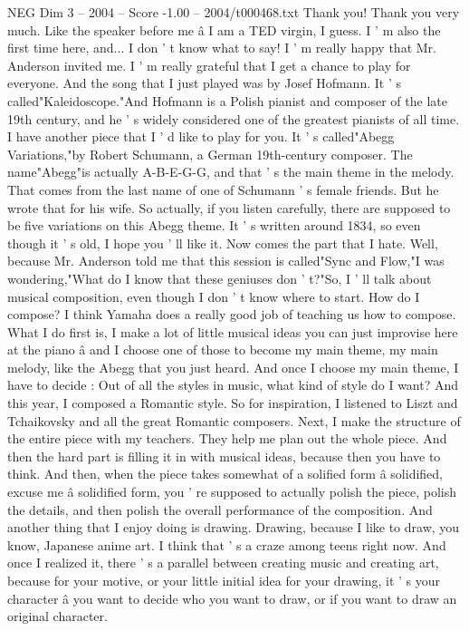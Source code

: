 \begin{textsample}{NEG Dim 3 – 2004 – Score -1.00 – 2004/t000468.txt}  \label{ex:f3_neg_014}
Thank you!
Thank you very much.
Like the speaker before me â I am a TED virgin, I guess.
I ' m also the first time here, and...
I don ' t know what to say!
I ' m really happy that Mr.
Anderson invited me.
I ' m really grateful that I get a chance to play for everyone.
And the song that I just played was by Josef Hofmann.
It ' s called"Kaleidoscope."And Hofmann is a Polish pianist and composer of the late 19th century, and he ' s widely considered one of the greatest pianists of all time.
I have another piece that I ' d like to play for you.
It ' s called"Abegg Variations,"by Robert Schumann, a German 19th-century composer.
The name"Abegg"is actually A-B-E-G-G, and that ' s the main theme in the melody.
That comes from the last name of one of Schumann ' s female friends.
But he wrote that for his wife.
So actually, if you listen carefully, there are supposed to be five variations on this Abegg theme.
It ' s written around 1834, so even though it ' s old, I hope you ' ll like it.
Now comes the part that I hate.
Well, because Mr.
Anderson told me that this session is called"Sync and Flow,"I was wondering,"What do I know that these geniuses don ' t?"So, I ' ll talk about musical composition, even though I don ' t know where to start.
How do I compose?
I think Yamaha does a really good job of teaching us how to compose.
What I do first is, I make a lot of little musical ideas you can just improvise here at the piano â and I choose one of those to become my main theme, my main melody, like the Abegg that you just heard.
And once I choose my main theme, I have to decide : Out of all the styles in music, what kind of style do I want?
And this year, I composed a Romantic style.
So for inspiration, I listened to Liszt and Tchaikovsky and all the great Romantic composers.
Next, I make the structure of the entire piece with my teachers.
They help me plan out the whole piece.
And then the hard part is filling it in with musical ideas, because then you have to think.
And then, when the piece takes somewhat of a solified form â solidified, excuse me â solidified form, you ' re supposed to actually polish the piece, polish the details, and then polish the overall performance of the composition.
And another thing that I enjoy doing is drawing.
Drawing, because I like to draw, you know, Japanese anime art.
I think that ' s a craze among teens right now.
And once I realized it, there ' s a parallel between creating music and creating art, because for your motive, or your little initial idea for your drawing, it ' s your character â you want to decide who you want to draw, or if you want to draw an original character.

\end{textsample}
